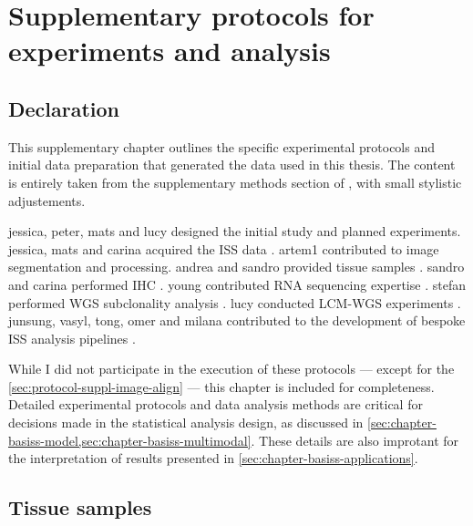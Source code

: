 \chapter{Supplementary protocols for experiments and analysis}

\section*{Declaration}

This supplementary chapter outlines the specific experimental protocols and initial data preparation that generated the data used in this thesis. The content is entirely taken from the supplementary methods section of \textcite{Lomakin2022-ks}, with small stylistic adjustements.

\ac{jessica}, \ac{peter}, \ac{mats} and \ac{lucy} designed the initial study and planned experiments. \ac{jessica}, \ac{mats} and \ac{carina} acquired the \ac{ISS} data . \ac{artem1} contributed to image segmentation and processing. \ac{andrea} and \ac{sandro} provided tissue samples . \ac{sandro} and \ac{carina} performed \ac{IHC} . \ac{young} contributed RNA sequencing expertise . \ac{stefan} performed \ac{WGS} subclonality analysis . \ac{lucy} conducted \ac{LCM}-\ac{WGS} experiments . \ac{junsung}, \ac{vasyl}, \ac{tong}, \ac{omer} and \ac{milana} contributed to the development of bespoke \ac{ISS} analysis pipelines .

While I did not participate in the execution of these protocols — except for the \cref{sec:protocol-suppl-image-align} — this chapter is included for completeness. Detailed experimental protocols and data analysis methods are critical for decisions made in the statistical analysis design, as discussed in \cref{sec:chapter-basiss-model,sec:chapter-basiss-multimodal}. These details are also improtant for the interpretation of results presented in \cref{sec:chapter-basiss-applications}.

\section{Tissue samples}
\label{sec:protocol-suppl-tissues}

